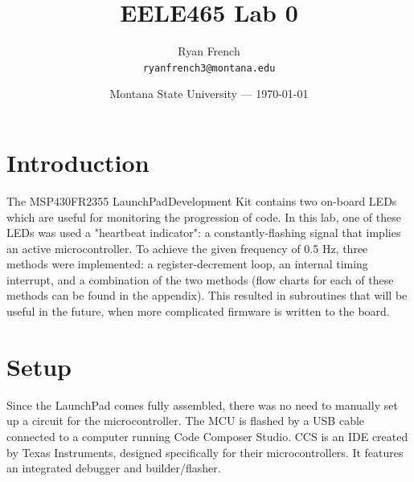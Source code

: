 \documentclass{article}
\title{EELE465 Lab 0} %
\author{Ryan French\\ \texttt{ryanfrench3@montana.edu}} %
\date{Montana State University --- \today} %
\begin{document}
\maketitle %


\section*{Introduction}

The MSP430FR2355 LaunchPad\texttrademark Development Kit contains two on-board LEDs which are useful for monitoring the progression of code. In this lab, one of these LEDs was used a "heartbeat indicator": a constantly-flashing signal that implies an active microcontroller. To achieve the given frequency of 0.5 Hz, three methods were implemented: a register-decrement loop, an internal timing interrupt, and a combination of the two methods (flow charts for each of these methods can be found in the appendix). This resulted in subroutines that will be useful in the future, when more complicated firmware is written to the board.





\section*{Setup}

Since the LaunchPad comes fully assembled, there was no need to manually set up a circuit for the microcontroller. The MCU is flashed by a USB cable connected to a computer running Code Composer Studio. CCS is an IDE created by Texas Instruments, designed specifically for their microcontrollers. It features an integrated debugger and builder/flasher.
\end{document}
